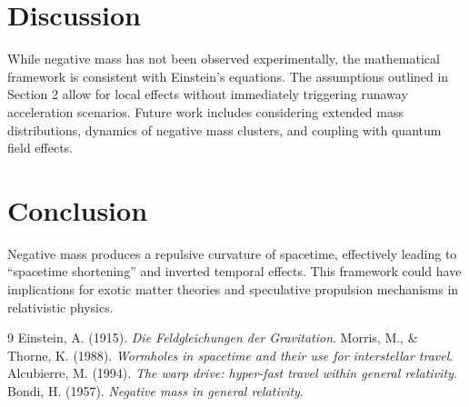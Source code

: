 \documentclass[12pt]{article}
\begin{document}
\section{Discussion}
While negative mass has not been observed experimentally, the mathematical framework is consistent with Einstein’s equations. The assumptions outlined in Section 2 allow for local effects without immediately triggering runaway acceleration scenarios. Future work includes considering extended mass distributions, dynamics of negative mass clusters, and coupling with quantum field effects.

\section{Conclusion}
Negative mass produces a repulsive curvature of spacetime, effectively leading to ``spacetime shortening'' and inverted temporal effects. This framework could have implications for exotic matter theories and speculative propulsion mechanisms in relativistic physics.

\begin{thebibliography}{9}
 Einstein, A. (1915). \textit{Die Feldgleichungen der Gravitation}.
 Morris, M., \& Thorne, K. (1988). \textit{Wormholes in spacetime and their use for interstellar travel}.
 Alcubierre, M. (1994). \textit{The warp drive: hyper-fast travel within general relativity}.
 Bondi, H. (1957). \textit{Negative mass in general relativity}.
\end{thebibliography}
\end{document}
